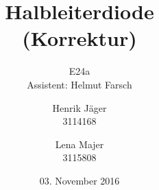 \documentclass[12pt,a4paper,]{scrreprt}
\begin{document}
	\title{Halbleiterdiode \\ (Korrektur)}
	\author{Henrik Jäger \\ 3114168 \and Lena Majer \\ 3115808}
	\subtitle{E24a \\  Assistent: Helmut Farsch}
	\subject{Physikalisches Praktikum I}
	\publishers{Universität Stuttgart}
	\date{03. November 2016}
	
	\maketitle%

	\tableofcontents   %
	\pagebreak	
	
    
    
    
    
    
    
    
    
\end{document}

